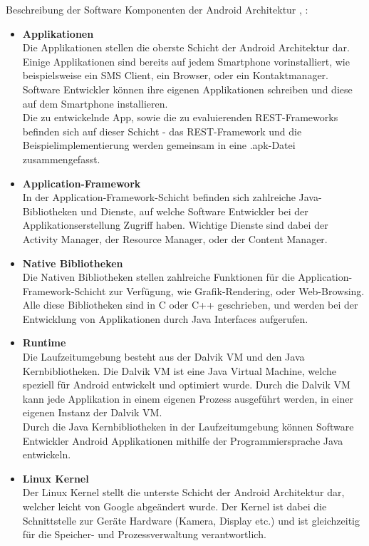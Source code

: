 Beschreibung der Software Komponenten der Android Architektur \cite{overviewAndroid:singh}, \cite{androidTutorialOS}: 
\begin{itemize}
	\item \textbf{Applikationen}\\
	Die Applikationen stellen die oberste Schicht der Android Architektur dar. Einige Applikationen sind bereits auf jedem Smartphone vorinstalliert, wie beispielsweise ein SMS Client,  ein Browser, oder ein Kontaktmanager. Software Entwickler können ihre eigenen Applikationen schreiben und diese auf dem Smartphone installieren.\\
	Die zu entwickelnde App, sowie die zu evaluierenden REST-Frameworks befinden sich auf dieser Schicht - das REST-Framework und die Beispielimplementierung werden gemeinsam in eine .apk-Datei zusammengefasst.
	\item \textbf{Application-Framework}\\
    In der Application-Framework-Schicht befinden sich zahlreiche Java-Bibliotheken und Dienste, auf welche Software Entwickler bei der Applikationserstellung Zugriff haben. Wichtige Dienste sind dabei der Activity Manager, der Resource Manager, oder der Content Manager.
	\item \textbf{Native Bibliotheken}\\
	Die Nativen Bibliotheken stellen zahlreiche Funktionen für die Application-Framework-Schicht zur Verfügung, wie Grafik-Rendering, oder Web-Browsing. Alle diese Bibliotheken sind in C oder C++ geschrieben, und werden bei der Entwicklung von Applikationen durch Java Interfaces aufgerufen.
	\item \textbf{Runtime}\\
	Die Laufzeitumgebung besteht aus der Dalvik \acrfull{VM} und den Java Kernbibliotheken. Die Dalvik VM ist eine Java Virtual Machine, welche speziell für Android entwickelt und optimiert wurde.  Durch die  Dalvik VM kann jede Applikation in einem eigenen Prozess ausgeführt werden, in einer eigenen Instanz der Dalvik VM. \\
	Durch die Java Kernbibliotheken in der Laufzeitumgebung können Software Entwickler Android Applikationen mithilfe der Programmiersprache Java entwickeln.   
	\item \textbf{Linux Kernel}\\
	Der Linux Kernel stellt die unterste Schicht der Android Architektur dar, welcher leicht von Google abgeändert wurde. Der Kernel ist dabei die Schnittstelle zur Geräte Hardware (Kamera, Display etc.) und ist gleichzeitig für die Speicher- und Prozessverwaltung verantwortlich.
\end{itemize}
	
